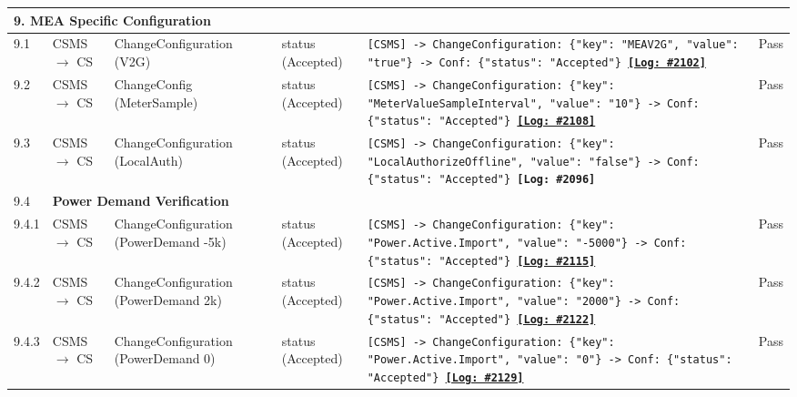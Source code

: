 \documentclass[10pt, a4paper, landscape]{article}
\begin{document}
\begin{longtable}{|p{1.0cm}|p{2.5cm}|p{4.0cm}|p{5.0cm}|p{10.0cm}|c|}
\multicolumn{6}{|l|}{\cellcolor{blue!10}\textbf{9. MEA Specific Configuration}} \\
\hline
9.1 & CSMS $\to$ CS & ChangeConfiguration (V2G) & status (Accepted) & \footnotesize\texttt{[CSMS] -> ChangeConfiguration: \{"key": "MEAV2G", "value": "true"\} \newline [CS] -> Conf: \{"status": "Accepted"\} \newline \hyperref[log:9.1]{\textbf{[Log: \#2102]}}} & Pass \\
\hline
9.2 & CSMS $\to$ CS & ChangeConfig (MeterSample) & status (Accepted) & \footnotesize\texttt{[CSMS] -> ChangeConfiguration: \{"key": "MeterValueSampleInterval", "value": "10"\} \newline [CS] -> Conf: \{"status": "Accepted"\} \newline \hyperref[log:9.2]{\textbf{[Log: \#2108]}}} & Pass \\
\hline
9.3 & CSMS $\to$ CS & ChangeConfiguration (LocalAuth) & status (Accepted) & \footnotesize\texttt{[CSMS] -> ChangeConfiguration: \{"key": "LocalAuthorizeOffline", "value": "false"\} \newline [CS] -> Conf: \{"status": "Accepted"\} \newline \textbf{[Log: \#2096]}} & Pass \\
\hline
9.4 & \multicolumn{5}{|l|}{\textbf{Power Demand Verification}} \\
\hline
9.4.1 & CSMS $\to$ CS & ChangeConfiguration (PowerDemand -5k) & status (Accepted) & \footnotesize\texttt{[CSMS] -> ChangeConfiguration: \{"key": "Power.Active.Import", "value": "-5000"\} \newline [CS] -> Conf: \{"status": "Accepted"\} \newline \hyperref[log:9.4.1]{\textbf{[Log: \#2115]}}} & Pass \\
\hline
9.4.2 & CSMS $\to$ CS & ChangeConfiguration (PowerDemand 2k) & status (Accepted) & \footnotesize\texttt{[CSMS] -> ChangeConfiguration: \{"key": "Power.Active.Import", "value": "2000"\} \newline [CS] -> Conf: \{"status": "Accepted"\} \newline \hyperref[log:9.4.2]{\textbf{[Log: \#2122]}}} & Pass \\
\hline
9.4.3 & CSMS $\to$ CS & ChangeConfiguration (PowerDemand 0) & status (Accepted) & \footnotesize\texttt{[CSMS] -> ChangeConfiguration: \{"key": "Power.Active.Import", "value": "0"\} \newline [CS] -> Conf: \{"status": "Accepted"\} \newline \hyperref[log:9.4.3]{\textbf{[Log: \#2129]}}} & Pass \\
\hline


\end{longtable}
\end{document}
